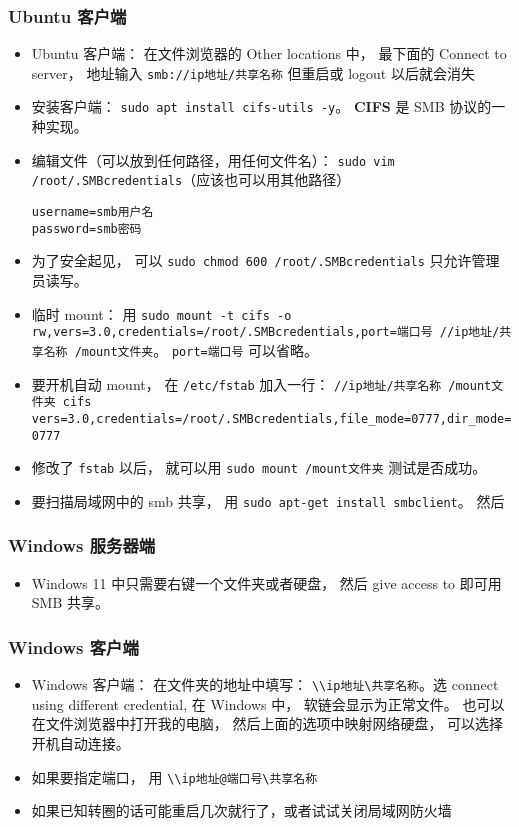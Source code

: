 \subsubsection{Ubuntu 客户端}
\begin{itemize}
\item Ubuntu 客户端： 在文件浏览器的 Other locations 中， 最下面的 Connect to server， 地址输入 \verb`smb://ip地址/共享名称` 但重启或 logout 以后就会消失
\item 安装客户端： \verb`sudo apt install cifs-utils -y`。 \textbf{CIFS} 是 SMB 协议的一种实现。
\item 编辑文件（可以放到任何路径，用任何文件名）： \verb`sudo vim /root/.SMBcredentials`（应该也可以用其他路径）
\begin{lstlisting}[language=none]
username=smb用户名
password=smb密码
\end{lstlisting}
\item 为了安全起见， 可以 \verb`sudo chmod 600 /root/.SMBcredentials` 只允许管理员读写。
\item 临时 mount： 用 \verb`sudo mount -t cifs -o rw,vers=3.0,credentials=/root/.SMBcredentials,port=端口号 //ip地址/共享名称 /mount文件夹`。 \verb`port=端口号` 可以省略。
\item 要开机自动 mount， 在 \verb`/etc/fstab` 加入一行： \verb`//ip地址/共享名称 /mount文件夹 cifs vers=3.0,credentials=/root/.SMBcredentials,file_mode=0777,dir_mode=0777`
\item 修改了 \verb`fstab` 以后， 就可以用 \verb`sudo mount /mount文件夹` 测试是否成功。
\item 要扫描局域网中的 smb 共享， 用 \verb`sudo apt-get install smbclient`。 然后
\end{itemize}

\subsubsection{Windows 服务器端}
\begin{itemize}
\item Windows 11 中只需要右键一个文件夹或者硬盘， 然后 give access to 即可用 SMB 共享。
\end{itemize}

\subsubsection{Windows 客户端}
\begin{itemize}
\item Windows 客户端： 在文件夹的地址中填写： \verb`\\ip地址\共享名称`。选 connect using different credential, 在 Windows 中， 软链会显示为正常文件。 也可以在文件浏览器中打开我的电脑， 然后上面的选项中映射网络硬盘， 可以选择开机自动连接。
\item 如果要指定端口， 用 \verb`\\ip地址@端口号\共享名称`
\item 如果已知转圈的话可能重启几次就行了，或者试试关闭局域网防火墙
\end{itemize}

